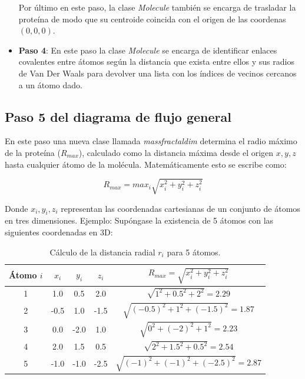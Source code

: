 \begin{itemize}
		Por último en este paso, la clase \textit{Molecule} también se encarga de trasladar 
		la proteína de modo que su centroide coincida con el origen de las coordenas $(0, 0, 0)$.  
		
		
		\item \textbf{Paso 4}: En este paso la clase \textit{Molecule} se encarga de identificar 
		enlaces covalentes entre átomos según la distancia que exista entre ellos y sus radios 
		de Van Der Waals para devolver una lista con los índices de vecinos cercanos a un átomo dado.
		
	\end{itemize}


	\subsection{Paso 5 del diagrama de flujo general}
	
	En este paso una nueva clase llamada \textit{massfractaldim} determina el radio máximo de la 
	proteína ($R_{max}$), calculado como la distancia máxima desde el origen $x, y, z$ hasta 
	cualquier átomo de la molécula. Matemáticamente esto se escribe como:
	
	\begin{equation}
		R_{max} = max_{i} \sqrt{x^{2}_{i} + y^{2}_{i} + z^{2}_{i}}
	\end{equation}
 	
 	Donde $x_{i}, y_{i}, z_{i}$ representan las coordenadas cartesianas de un conjunto de átomos 
 	en tres dimensiones. Ejemplo: Supóngase la existencia de 5 átomos con las siguientes 
 	coordenadas en 3D:
 	
 	\begin{table}[h!]
 		\centering
 		\begin{tabular}{ccccc}
 			\textbf{Átomo $i$} & \textbf{$x_i$} & \textbf{$y_i$} & \textbf{$z_i$} & $R_{max}= \sqrt{x_i^2 + y_i^2 + z_i^2}$ \\
 			\hline
 			1 & 1.0 & 0.5 & 2.0 & $\sqrt{1^2 + 0.5^2 + 2^2} = 2.29$ \\
 			2 & -0.5 & 1.0 & -1.5 & $\sqrt{(-0.5)^2 + 1^2 + (-1.5)^2} = 1.87$ \\
 			3 & 0.0 & -2.0 & 1.0 & $\sqrt{0^2 + (-2)^2 + 1^2} = 2.23$ \\
 			4 & 2.0 & 1.5 & 0.5 & $\sqrt{2^2 + 1.5^2 + 0.5^2} = 2.54$ \\
 			5 & -1.0 & -1.0 & -2.5 & $\sqrt{(-1)^2 + (-1)^2 + (-2.5)^2} = 2.87$ \\
 		\end{tabular}
 		\caption{Cálculo de la distancia radial $r_i$ para 5 átomos.}
 	\end{table}
 	
